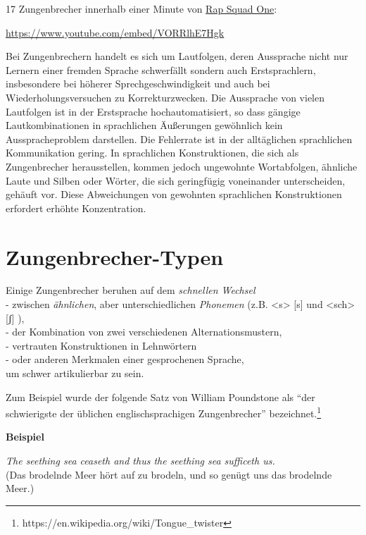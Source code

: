 \documentclass[
  letterpaper,
]{scrbook}
\begin{document}
17 Zungenbrecher innerhalb einer Minute von
\href{https://www.youtube.com/watch?v=VORRlhE7Hgk}{Rap Squad One}:

\url{https://www.youtube.com/embed/VORRlhE7Hgk}

Bei Zungenbrechern handelt es sich um Lautfolgen, deren Aussprache nicht
nur Lernern einer fremden Sprache schwerfällt sondern auch
Erstsprachlern, insbesondere bei höherer Sprechgeschwindigkeit und auch
bei Wiederholungsversuchen zu Korrekturzwecken. Die Aussprache von
vielen Lautfolgen ist in der Erstsprache hochautomatisiert, so dass
gängige Lautkombinationen in sprachlichen Äußerungen gewöhnlich kein
Ausspracheproblem darstellen. Die Fehlerrate ist in der alltäglichen
sprachlichen Kommunikation gering. In sprachlichen Konstruktionen, die
sich als Zungenbrecher herausstellen, kommen jedoch ungewohnte
Wortabfolgen, ähnliche Laute und Silben oder Wörter, die sich
geringfügig voneinander unterscheiden, gehäuft vor. Diese Abweichungen
von gewohnten sprachlichen Konstruktionen erfordert erhöhte
Konzentration.

\hypertarget{zungenbrecher-typen}{%
\section{Zungenbrecher-Typen}\label{zungenbrecher-typen}}

Einige Zungenbrecher beruhen auf dem \emph{schnellen Wechsel}\\
- zwischen \emph{ähnlichen}, aber unterschiedlichen \emph{Phonemen}
(z.B. \textless s\textgreater{} {[}s{]} und \textless sch\textgreater{}
{[}ʃ{]} ),\\
- der Kombination von zwei verschiedenen Alternationsmustern,\\
- vertrauten Konstruktionen in Lehnwörtern\\
- oder anderen Merkmalen einer gesprochenen Sprache,\\
um schwer artikulierbar zu sein.

Zum Beispiel wurde der folgende Satz von William Poundstone als ``der
schwierigste der üblichen englischsprachigen Zungenbrecher''
bezeichnet.\footnote{https://en.wikipedia.org/wiki/Tongue\_twister}

\begin{tcolorbox}[enhanced jigsaw, opacityback=0, colback=white, breakable, toprule=.15mm, rightrule=.15mm, bottomrule=.15mm, colframe=quarto-callout-note-color-frame, arc=.35mm, leftrule=.75mm, left=2mm]
\begin{minipage}[t]{5.5mm}
\textcolor{quarto-callout-note-color}{\faInfo}
\end{minipage}%
\begin{minipage}[t]{\textwidth - 5.5mm}

\textbf{Beispiel}\vspace{2mm}

\emph{The seething sea ceaseth and thus the seething sea sufficeth
us.}\\
(Das brodelnde Meer hört auf zu brodeln, und so genügt uns das brodelnde
Meer.)

\end{minipage}%
\end{tcolorbox}
\end{document}
